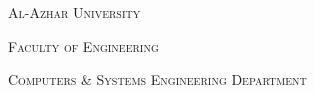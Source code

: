 {\scshape\large Al-Azhar University\par}
{\scshape\Large Faculty of Engineering\par}
{\scshape\LARGE Computers \& Systems Engineering Department\par}